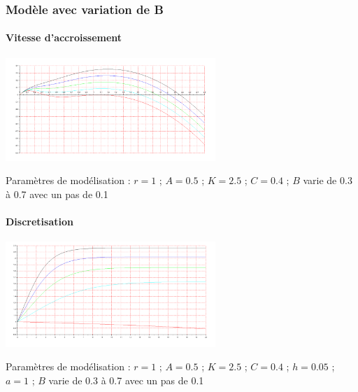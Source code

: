 \documentclass{article}
\begin{document}
\paragraph{}

\subsubsection{Modèle avec variation de B}

\paragraph{Vitesse d'accroissement}
\begin{center}
\includegraphics[width=300px]{img/part2/LogB.png}
\end{center}
Paramètres de modélisation : $r=1$ ; $A=0.5$ ; $K=2.5$ ; $C=0.4$ ; $B$ varie de 0.3 à 0.7 avec un pas de 0.1
\paragraph{}


\paragraph{Discretisation}
\begin{center}
\includegraphics[width=300px]{img/part2/TrajB.png}
\end{center}
Paramètres de modélisation : $r=1$ ; $A=0.5$ ; $K=2.5$ ; $C=0.4$ ; $h=0.05$ ; $a=1$ ; $B$ varie de 0.3 à 0.7 avec un pas de 0.1
\paragraph{}
\end{document}
